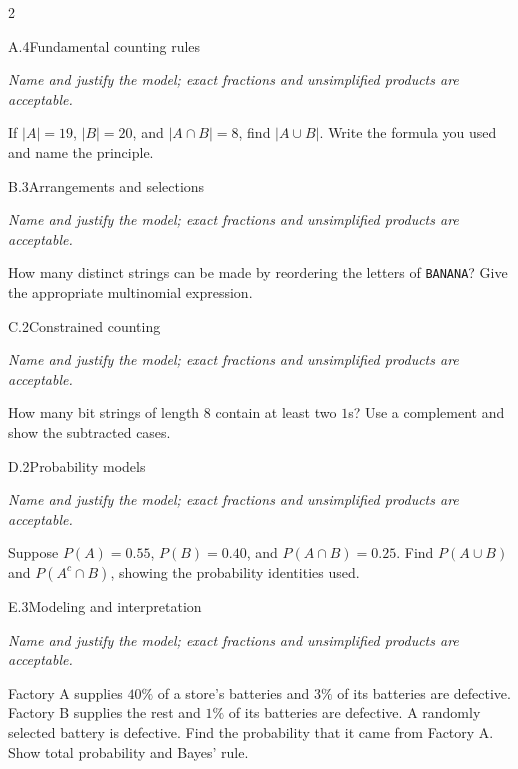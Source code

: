 \documentclass[9pt]{extarticle}
\begin{document}
\CoreWorkArea
\FormBreak
{}
\begin{multicols}{2}
\begin{CoreProblem}{A.4}{Fundamental counting rules}
{\scriptsize\textit{Name and justify the model; exact fractions and unsimplified products are acceptable.}\par}
If $|A|=19$, $|B|=20$, and $|A\cap B|=8$, find $|A\cup B|$. Write
    the formula you used and name the principle.
\end{CoreProblem}
\begin{CoreProblem}{B.3}{Arrangements and selections}
{\scriptsize\textit{Name and justify the model; exact fractions and unsimplified products are acceptable.}\par}
How many distinct strings can be made by reordering the letters of
    \texttt{BANANA}? Give the appropriate multinomial expression.
\end{CoreProblem}
\begin{CoreProblem}{C.2}{Constrained counting}
{\scriptsize\textit{Name and justify the model; exact fractions and unsimplified products are acceptable.}\par}
How many bit strings of length 8 contain at least two $1$s? Use a
    complement and show the subtracted cases.
\end{CoreProblem}
\columnbreak
\begin{CoreProblem}{D.2}{Probability models}
{\scriptsize\textit{Name and justify the model; exact fractions and unsimplified products are acceptable.}\par}
Suppose $P(A)=0.55$, $P(B)=0.40$, and $P(A\cap B)=0.25$. Find
    $P(A\cup B)$ and $P(A^c\cap B)$, showing the probability identities used.
\end{CoreProblem}
\begin{CoreProblem}{E.3}{Modeling and interpretation}
{\scriptsize\textit{Name and justify the model; exact fractions and unsimplified products are acceptable.}\par}
Factory A supplies $40\%$ of a store's batteries and $3\%$ of its
    batteries are defective. Factory B supplies the rest and $1\%$ of its
    batteries are defective. A randomly selected battery is defective. Find the
    probability that it came from Factory A. Show total probability and Bayes'
    rule.
\end{CoreProblem}
\end{multicols}
\CoreWorkArea
\FormBreak
{}
\end{document}
